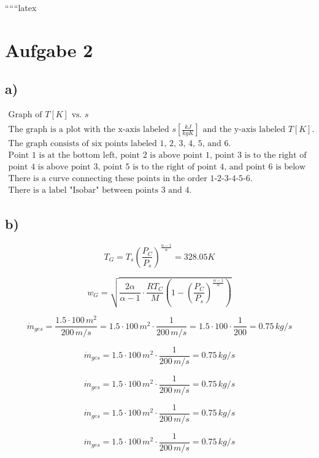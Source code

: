 
``````latex


\section*{Aufgabe 2}

\subsection*{a)}

\[
\begin{array}{c}
\text{Graph of } T[K] \text{ vs. } s \\
\text{The graph is a plot with the x-axis labeled } s \left[ \frac{kJ}{kgK} \right] \text{ and the y-axis labeled } T[K]. \\
\text{The graph consists of six points labeled 1, 2, 3, 4, 5, and 6.} \\
\text{Point 1 is at the bottom left, point 2 is above point 1, point 3 is to the right of point 2,} \\
\text{point 4 is above point 3, point 5 is to the right of point 4, and point 6 is below point 5.} \\
\text{There is a curve connecting these points in the order 1-2-3-4-5-6.} \\
\text{There is a label "Isobar" between points 3 and 4.}
\end{array}
\]

\subsection*{b)}

\[
T_G = T_s \left( \frac{P_C}{P_s} \right)^{\frac{\alpha - 1}{\alpha}} = 328.05 K
\]

\[
w_G = \sqrt{\frac{2 \alpha}{\alpha - 1} \cdot \frac{R T_C}{M} \left( 1 - \left( \frac{P_C}{P_s} \right)^{\frac{\alpha - 1}{\alpha}} \right)}
\]

\[
\dot{m}_{ges} = \frac{1.5 \cdot 100 \, m^2}{200 \, m/s} = 1.5 \cdot 100 \, m^2 \cdot \frac{1}{200 \, m/s} = 1.5 \cdot 100 \cdot \frac{1}{200} = 0.75 \, kg/s
\]

\[
\dot{m}_{ges} = 1.5 \cdot 100 \, m^2 \cdot \frac{1}{200 \, m/s} = 0.75 \, kg/s
\]

\[
\dot{m}_{ges} = 1.5 \cdot 100 \, m^2 \cdot \frac{1}{200 \, m/s} = 0.75 \, kg/s
\]

\[
\dot{m}_{ges} = 1.5 \cdot 100 \, m^2 \cdot \frac{1}{200 \, m/s} = 0.75 \, kg/s
\]

\[
\dot{m}_{ges} = 1.5 \cdot 100 \, m^2 \cdot \frac{1}{200 \, m/s} = 0.75 \, kg/s
\]

